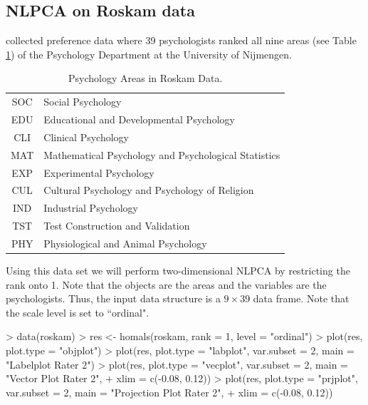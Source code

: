 \documentclass[article]{Z}
\begin{document}
\subsection{NLPCA on Roskam data}
\label{sec:pcex}
\citet{Roskam:68} collected preference data where 39 psychologists ranked all nine areas (see Table \ref{tab:area}) of the Psychology Department at the University of Nijmengen. 

\begin{table}[h]
\centering
\begin{tabular}{|c|l|}
\hline
SOC& Social Psychology\\
EDU& Educational and Developmental Psychology\\
CLI& Clinical Psychology\\
MAT& Mathematical Psychology and Psychological Statistics\\
EXP& Experimental Psychology\\
CUL& Cultural Psychology and Psychology of Religion\\
IND& Industrial Psychology\\
TST& Test Construction and Validation\\
PHY& Physiological and Animal Psychology\\
\hline
\end{tabular}
\caption{\label{tab:area}Psychology Areas in Roskam Data.}
\end{table}

Using this data set we will perform two-dimensional NLPCA by restricting the rank onto 1. Note that the objects are the areas and the variables are the psychologists. Thus, the input data structure is a $9 \times 39$ data frame. Note that the scale level is set to ``ordinal".

\begin{Schunk}
\begin{Sinput}
> data(roskam)
> res <- homals(roskam, rank = 1, level = "ordinal")
> plot(res, plot.type = "objplot")
> plot(res, plot.type = "labplot", var.subset = 2, main = "Labelplot Rater 2")
> plot(res, plot.type = "vecplot", var.subset = 2, main = "Vector Plot Rater 2", 
+     xlim = c(-0.08, 0.12))
> plot(res, plot.type = "prjplot", var.subset = 2, main = "Projection Plot Rater 2", 
+     xlim = c(-0.08, 0.12))
\end{Sinput}
\end{Schunk}
\end{document}
